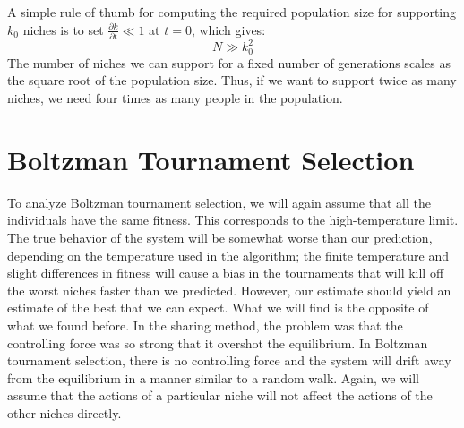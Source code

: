 A simple rule of thumb for computing the required population size for 
supporting $k_0$ niches is to set $\frac{\partial k}{\partial t} \ll 1$
at $t=0$, which gives:
\begin{equation}
N \gg k_0^2
\end{equation}
The number of niches we can support for a fixed number of generations
scales as the square root of the population size.  Thus, if we want
to support twice as many niches, we need four times as many people in
the population.

\section{Boltzman Tournament Selection}
To analyze Boltzman tournament selection, we will again assume that
all the individuals have the same fitness.  This corresponds to the
high-temperature limit.  The true behavior of the system will be somewhat
worse than our prediction, depending on the temperature used in the
algorithm; the finite temperature and slight differences in fitness
will cause a bias in the tournaments that will kill off the worst niches
faster than we predicted.  However, our estimate should yield an estimate
of the best that we can expect.  What we will find is the opposite of
what we found before.  In the sharing method, the problem was that the
controlling force was so strong that it overshot the equilibrium.  In
Boltzman tournament selection, there is no controlling force and the
system will drift away from the equilibrium in a manner similar to
a random walk.   Again, we will assume that the actions of a particular
niche will not affect the actions of the other niches directly.

